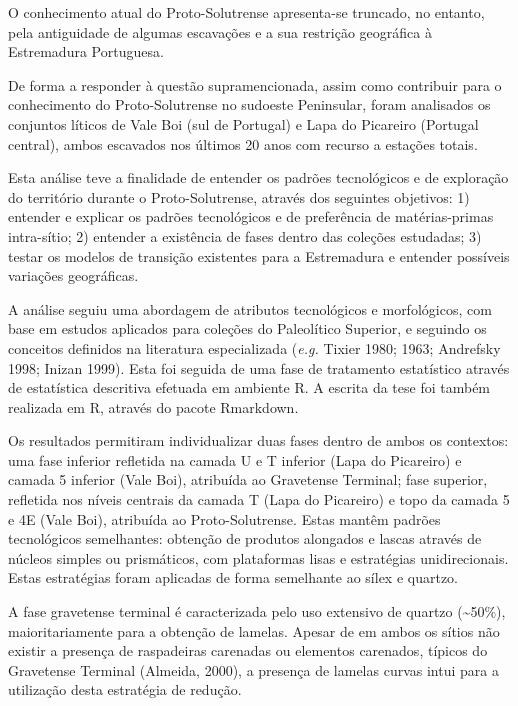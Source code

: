 \documentclass[12pt,twoside]{reedthesis}
\begin{document}
\begin{resumo}
    O conhecimento atual do Proto-Solutrense apresenta-se truncado, no entanto, pela antiguidade de algumas escavações e a sua restrição geográfica à Estremadura Portuguesa.
    
    De forma a responder à questão supramencionada, assim como contribuir para o conhecimento do Proto-Solutrense no sudoeste Peninsular, foram analisados os conjuntos líticos de Vale Boi (sul de Portugal) e Lapa do Picareiro (Portugal central), ambos escavados nos últimos 20 anos com recurso a estações totais.
    
    Esta análise teve a finalidade de entender os padrões tecnológicos e de exploração do território durante o Proto-Solutrense, através dos seguintes objetivos: 1) entender e explicar os padrões tecnológicos e de preferência de matérias-primas intra-sítio; 2) entender a existência de fases dentro das coleções estudadas; 3) testar os modelos de transição existentes para a Estremadura e entender possíveis variações geográficas.
    
    A análise seguiu uma abordagem de atributos tecnológicos e morfológicos, com base em estudos aplicados para coleções do Paleolítico Superior, e seguindo os conceitos definidos na literatura especializada (\emph{e.g.} Tixier 1980; 1963; Andrefsky 1998; Inizan 1999). Esta foi seguida de uma fase de tratamento estatístico através de estatística descritiva efetuada em ambiente R. A escrita da tese foi também realizada em R, através do pacote Rmarkdown.
    
    Os resultados permitiram individualizar duas fases dentro de ambos os contextos: uma fase inferior refletida na camada U e T inferior (Lapa do Picareiro) e camada 5 inferior (Vale Boi), atribuída ao Gravetense Terminal; fase superior, refletida nos níveis centrais da camada T (Lapa do Picareiro) e topo da camada 5 e 4E (Vale Boi), atribuída ao Proto-Solutrense. Estas mantêm padrões tecnológicos semelhantes: obtenção de produtos alongados e lascas através de núcleos simples ou prismáticos, com plataformas lisas e estratégias unidirecionais. Estas estratégias foram aplicadas de forma semelhante ao sílex e quartzo.
    
    A fase gravetense terminal é caracterizada pelo uso extensivo de quartzo (\textasciitilde50\%), maioritariamente para a obtenção de lamelas. Apesar de em ambos os sítios não existir a presença de raspadeiras carenadas ou elementos carenados, típicos do Gravetense Terminal (Almeida, 2000), a presença de lamelas curvas intui para a utilização desta estratégia de redução.
    

\end{resumo}
\end{document}
